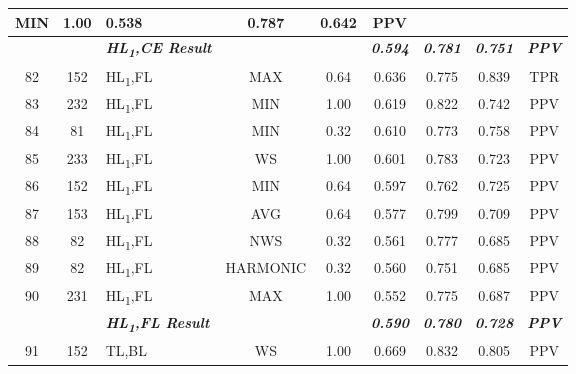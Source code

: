 \begin{table}[H]
{\begin{tabular}{cc|l|cc|c|c|c|c|}
    \multicolumn{1}{c|}{MIN} &
    1.00 &
    0.538 &
    0.787 &
    0.642 &
    PPV \\ \hline
   &
     &
    \textit{\textbf{HL\textsubscript{1},CE Result}} &
     &
     &
    \textit{\textbf{0.594}} &
    \textit{\textbf{0.781}} &
    \textit{\textbf{0.751}} &
    \textit{\textbf{PPV}} \\ \hline
  \multicolumn{1}{|c|}{82} &
    152 &
    HL\textsubscript{1},FL &
    \multicolumn{1}{c|}{MAX} &
    0.64 &
    0.636 &
    0.775 &
    0.839 &
    TPR \\ \hline
  \multicolumn{1}{|c|}{83} &
    232 &
    HL\textsubscript{1},FL &
    \multicolumn{1}{c|}{MIN} &
    1.00 &
    0.619 &
    0.822 &
    0.742 &
    PPV \\ \hline
  \multicolumn{1}{|c|}{84} &
    81 &
    HL\textsubscript{1},FL &
    \multicolumn{1}{c|}{MIN} &
    0.32 &
    0.610 &
    0.773 &
    0.758 &
    PPV \\ \hline
  \multicolumn{1}{|c|}{85} &
    233 &
    HL\textsubscript{1},FL &
    \multicolumn{1}{c|}{WS} &
    1.00 &
    0.601 &
    0.783 &
    0.723 &
    PPV \\ \hline
  \multicolumn{1}{|c|}{86} &
    152 &
    HL\textsubscript{1},FL &
    \multicolumn{1}{c|}{MIN} &
    0.64 &
    0.597 &
    0.762 &
    0.725 &
    PPV \\ \hline
  \multicolumn{1}{|c|}{87} &
    153 &
    HL\textsubscript{1},FL &
    \multicolumn{1}{c|}{AVG} &
    0.64 &
    0.577 &
    0.799 &
    0.709 &
    PPV \\ \hline
  \multicolumn{1}{|c|}{88} &
    82 &
    HL\textsubscript{1},FL &
    \multicolumn{1}{c|}{NWS} &
    0.32 &
    0.561 &
    0.777 &
    0.685 &
    PPV \\ \hline
  \multicolumn{1}{|c|}{89} &
    82 &
    HL\textsubscript{1},FL &
    \multicolumn{1}{c|}{HARMONIC} &
    0.32 &
    0.560 &
    0.751 &
    0.685 &
    PPV \\ \hline
  \multicolumn{1}{|c|}{90} &
    231 &
    HL\textsubscript{1},FL &
    \multicolumn{1}{c|}{MAX} &
    1.00 &
    0.552 &
    0.775 &
    0.687 &
    PPV \\ \hline
   &
     &
    \textit{\textbf{HL\textsubscript{1},FL Result}} &
     &
     &
    \textit{\textbf{0.590}} &
    \textit{\textbf{0.780}} &
    \textit{\textbf{0.728}} &
    \textit{\textbf{PPV}} \\ \hline
  \multicolumn{1}{|c|}{91} &
    152 &
    TL,BL &
    \multicolumn{1}{c|}{WS} &
    1.00 &
    0.669 &
    0.832 &
    0.805 &
    PPV \\ \hline

\end{tabular}}
\end{table}

